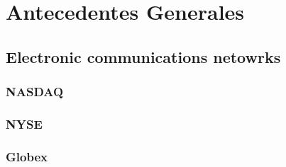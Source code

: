 \section{Antecedentes Generales}
\subsection{Electronic communications netowrks}
\subsubsection{NASDAQ}
\subsubsection{NYSE}
\subsubsection{Globex}
